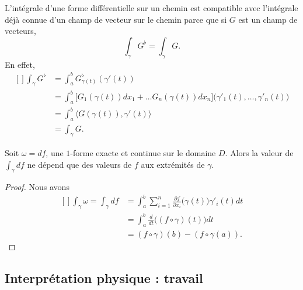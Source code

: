 L'intégrale d'une forme différentielle sur un chemin est compatible avec l'intégrale déjà connue d'un champ de vecteur sur le chemin parce que si \( G\) est un champ de vecteurs,
\begin{equation}
	\int_{\gamma}G^{\flat}=\int_{\gamma}G.
\end{equation}
En effet,
\begin{equation}
	\begin{aligned}[]
		\int_{\gamma} G^{\flat} & =\int_a^b G_{\gamma(t)}^{\flat}(\gamma'(t))                                                                     \\
		                        & =\int_a^b\big[ G_1( \gamma(t) )dx_1+\ldots G_n(\gamma(t))dx_n \big]\big( \gamma'_1(t),\ldots,\gamma'_n(t) \big) \\
		                        & =\int_{a}^b\langle G(\gamma(t)), \gamma'(t)\rangle                                                              \\
		                        & =\int_{\gamma}G.
	\end{aligned}
\end{equation}


\begin{proposition}
	Soit \( \omega=df\), une \( 1\)-forme exacte et continue sur le domaine \( D\). Alors la valeur de \( \int_{\gamma}df\) ne dépend que des valeurs de \( f\) aux extrémités de \( \gamma\).
\end{proposition}

\begin{proof}
	Nous avons
	\begin{equation}
		\begin{aligned}[]
			\int_{\gamma}\omega=\int_{\gamma}df & =\int_{a}^b\sum_{i=1}^n\frac{ \partial f }{ \partial x_i }\big( \gamma(t) \big)\gamma'_i(t)dt \\
			                                    & =\int_a^b\frac{ d }{ dt }\Big( (f\circ\gamma)(t) \Big)dt                                      \\
			                                    & =(f\circ\gamma)(b)-(f\circ\gamma(a)).
		\end{aligned}
	\end{equation}
\end{proof}

\subsection{Interprétation physique : travail}

